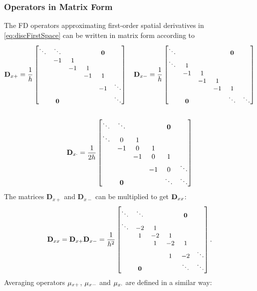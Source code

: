 \subsubsection{Operators in Matrix Form}
The FD operators approximating first-order spatial derivatives in \eqref{eq:discFirstSpace} can be written in matrix form according to
\begin{gather*}\small
    \mathbf{D}_{x+} = \frac{1}{h}\begin{bmatrix}
        \ddots &\ddots & & & \mathbf{0}&\\
         & -1 & 1 & & & \\
        & & -1 & 1 & & \\
        & & & -1 & 1 & \\
        & & & & -1 & \ddots\\
        &\mathbf{0} & & & & \ddots \\
    \end{bmatrix}
    \quad
    \mathbf{D}_{x-} = \frac{1}{h}\begin{bmatrix}
        \ddots & & & & \mathbf{0}&\\
        \ddots & 1 & & & & \\
        & -1 & 1 & & & \\
        & & -1 & 1 & & \\
        & & & -1 & 1 & \\
        &\mathbf{0} & & & \ddots & \ddots \\
    \end{bmatrix}\\
    \\
    \mathbf{D}_{x\cdot} = \frac{1}{2h}\begin{bmatrix}\small
        \ddots &\ddots & & & \mathbf{0}&\\
        \ddots & 0 & 1 & & & \\
        & -1 & 0 & 1 & & \\
        & & -1 & 0 & 1 & \\
        & & & -1 & 0 & \ddots \\
        &\mathbf{0} & & & \ddots & \ddots \\
    \end{bmatrix}\\
\end{gather*}
The matrices $\mathbf{D}_{x+}$ and $\mathbf{D}_{x-}$ can be multiplied to get $\mathbf{D}_{xx}$:
\begin{equation}\small
    \mathbf{D}_{xx} = \mathbf{D}_{x+}\mathbf{D}_{x-} = \frac{1}{h^2}\begin{bmatrix}
        \ddots &\ddots & & & \mathbf{0}&\\
        \ddots & -2 & 1 & & & \\
        & 1 & -2 & 1 & & \\
        & & 1 & -2 & 1 & \\
        & & & 1 & -2 & \ddots \\
        &\mathbf{0} & & & \ddots & \ddots \\
    \end{bmatrix}.
\end{equation}
%
Averaging operators $\mu_{x+}$, $\mu_{x-}$ and $\mu_{x\cdot}$ are defined in a similar way:

